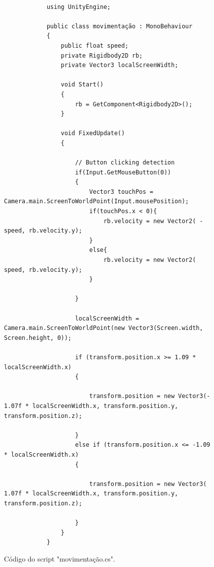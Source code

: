     \begin{figure}[ht!]
        \centering
        \begin{lstlisting}
            
            using UnityEngine;

            public class movimentação : MonoBehaviour
            {
                public float speed;
                private Rigidbody2D rb;
                private Vector3 localScreenWidth;

                void Start()
                {
                    rb = GetComponent<Rigidbody2D>();
                }

                void FixedUpdate()
                {
                    
                    // Button clicking detection
                    if(Input.GetMouseButton(0))
                    {
                        Vector3 touchPos = Camera.main.ScreenToWorldPoint(Input.mousePosition);
                        if(touchPos.x < 0){
                            rb.velocity = new Vector2( -speed, rb.velocity.y);
                        }
                        else{
                            rb.velocity = new Vector2( speed, rb.velocity.y);
                        }

                    }  

                    localScreenWidth = Camera.main.ScreenToWorldPoint(new Vector3(Screen.width, Screen.height, 0));

                    if (transform.position.x >= 1.09 * localScreenWidth.x)
                    {

                        transform.position = new Vector3(- 1.07f * localScreenWidth.x, transform.position.y, transform.position.z);

                    }
                    else if (transform.position.x <= -1.09 * localScreenWidth.x)
                    {

                        transform.position = new Vector3( 1.07f * localScreenWidth.x, transform.position.y, transform.position.z);

                    }
                }
            }

        \end{lstlisting}
        \caption{Código do script "movimentação.cs".}
        \label{code:movimentacao}

    \end{figure}


